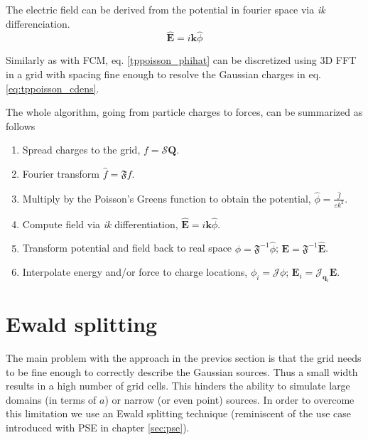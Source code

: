 \documentclass[ twoside,openright,titlepage,numbers=noenddot,%
headinclude,footinclude,cleardoublepage=empty,abstract=on,
BCOR=5mm,paper=a4,fontsize=11pt, dvipsnames
]{scrreprt}
\renewcommand{\vec}[1]{\bm{#1}}
\newcommand{\oper}[1]{\mathcal{#1}}
\newcommand{\fou}[1]{\widehat{#1}}
\newcommand{\ppos}{q}
\begin{document}
The electric field can be derived from the potential in fourier space via \emph{ik} differenciation.
\begin{equation}
    \label{tppoisson_ehat}
  \hat{\vec{E}} = i\vec{k}\hat{\phi}
\end{equation}

Similarly as with \gls{FCM}, eq. \eqref{tppoisson_phihat} can be discretized using 3D \gls{FFT} in a grid with spacing fine enough to resolve the Gaussian charges in eq. \eqref{eq:tppoisson_cdens}.

The whole algorithm, going from particle charges to forces, can be summarized as follows
\begin{enumerate}
\item Spread charges to the grid, $f=\oper{S}\vec{Q}$.
\item Fourier transform $\hat{f} = \mathfrak{F}f$.
\item Multiply by the Poisson's Greens function to obtain the potential, $\fou{\phi} = \frac{\hat{f}}{\varepsilon k^2}$.
\item Compute field via \emph{ik} differentiation, $\fou{\vec{E}} = i\vec{k}\fou\phi$.
\item Transform potential and field back to real space $\phi = \mathfrak{F}^{-1}\fou\phi$; $\vec{E} = \mathfrak{F}^{-1}\fou{\vec{E}}$.
\item Interpolate energy and/or force to charge locations, $\phi_i = \oper{J}\phi$; $\vec{E}_i = \oper{J}_{\vec{\ppos}_i}\vec{E}$.
\end{enumerate}
\section{Ewald splitting}\label{sec:tppoisson_ewald}
The main problem with the approach in the previos section is that the grid needs to be fine enough to correctly describe the Gaussian sources. Thus a small width results in a high number of grid cells. This hinders the ability to simulate large domains (in terms of $a$) or narrow (or even point) sources. In order to overcome this limitation we use an Ewald splitting technique\cite{Tornberg2015} (reminiscent of the use case introduced with \gls{PSE} in chapter \ref{sec:pse}).
\end{document}
